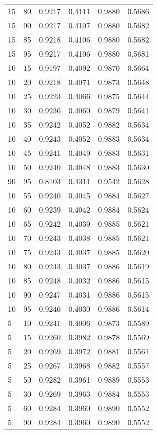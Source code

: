 \begin{center}
\begin{longtable}{|l|l|l|l|l|l|}
15 & 80 & 0.9217 & 0.4111 & 0.9880 & 0.5686 \\
15 & 90 & 0.9217 & 0.4107 & 0.9880 & 0.5682 \\
15 & 85 & 0.9218 & 0.4106 & 0.9880 & 0.5682 \\
15 & 95 & 0.9217 & 0.4106 & 0.9880 & 0.5681 \\
10 & 15 & 0.9197 & 0.4092 & 0.9870 & 0.5664 \\
10 & 20 & 0.9218 & 0.4071 & 0.9873 & 0.5648 \\
10 & 25 & 0.9223 & 0.4066 & 0.9875 & 0.5644 \\
10 & 30 & 0.9236 & 0.4060 & 0.9879 & 0.5641 \\
10 & 35 & 0.9242 & 0.4052 & 0.9882 & 0.5634 \\
10 & 40 & 0.9243 & 0.4052 & 0.9883 & 0.5634 \\
10 & 45 & 0.9241 & 0.4049 & 0.9883 & 0.5631 \\
10 & 50 & 0.9240 & 0.4048 & 0.9883 & 0.5630 \\
90 & 95 & 0.8103 & 0.4311 & 0.9542 & 0.5628 \\
10 & 55 & 0.9240 & 0.4045 & 0.9884 & 0.5627 \\
10 & 60 & 0.9239 & 0.4042 & 0.9884 & 0.5624 \\
10 & 65 & 0.9242 & 0.4039 & 0.9885 & 0.5621 \\
10 & 70 & 0.9243 & 0.4038 & 0.9885 & 0.5621 \\
10 & 75 & 0.9243 & 0.4037 & 0.9885 & 0.5620 \\
10 & 80 & 0.9243 & 0.4037 & 0.9886 & 0.5619 \\
10 & 85 & 0.9248 & 0.4032 & 0.9886 & 0.5615 \\
10 & 90 & 0.9247 & 0.4031 & 0.9886 & 0.5615 \\
10 & 95 & 0.9246 & 0.4030 & 0.9886 & 0.5614 \\
5  & 10 & 0.9241 & 0.4006 & 0.9873 & 0.5589 \\
5  & 15 & 0.9260 & 0.3982 & 0.9878 & 0.5569 \\
5  & 20 & 0.9269 & 0.3972 & 0.9881 & 0.5561 \\
5  & 25 & 0.9267 & 0.3968 & 0.9882 & 0.5557 \\
5  & 50 & 0.9282 & 0.3961 & 0.9889 & 0.5553 \\
5  & 30 & 0.9269 & 0.3963 & 0.9884 & 0.5553 \\
5  & 60 & 0.9284 & 0.3960 & 0.9890 & 0.5552 \\
5  & 90 & 0.9284 & 0.3960 & 0.9890 & 0.5552 \\

\end{longtable}
\end{center}
